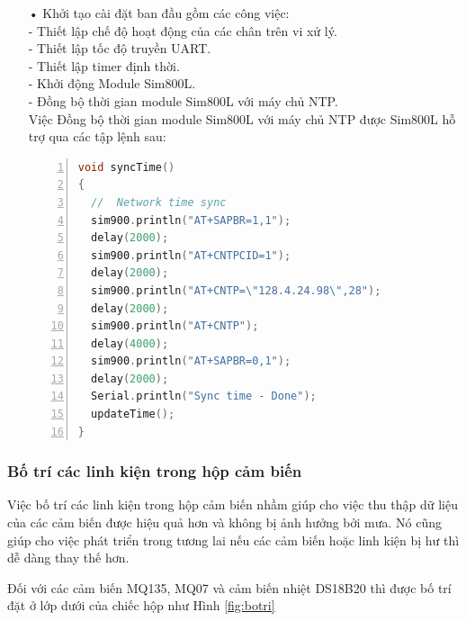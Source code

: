 \begin{itemize}
\item[•]Khởi tạo cài đặt ban đầu gồm các công việc: \\
- Thiết lập chế độ hoạt động của các chân trên vi xử lý.\\
- Thiết lập tốc độ truyền UART.\\
- Thiết lập timer định thời.\\
- Khởi động Module Sim800L.\\
- Đồng bộ thời gian module Sim800L với máy chủ NTP.\\

Việc Đồng bộ thời gian module Sim800L với máy chủ NTP được Sim800L hỗ trợ qua các tập lệnh sau:
\begin{lstlisting}[numbers=left,firstnumber=1,language=C]
void syncTime()
{
  //  Network time sync
  sim900.println("AT+SAPBR=1,1");
  delay(2000);
  sim900.println("AT+CNTPCID=1");
  delay(2000);
  sim900.println("AT+CNTP=\"128.4.24.98\",28");
  delay(2000);
  sim900.println("AT+CNTP");
  delay(4000);  
  sim900.println("AT+SAPBR=0,1");
  delay(2000);
  Serial.println("Sync time - Done");
  updateTime();
}
\end{lstlisting}







\end{itemize}









\subsubsection*{Bố trí các linh kiện trong hộp cảm biến}
Việc bố trí các linh kiện trong hộp cảm biến nhầm giúp cho việc thu thập dữ liệu của các cảm biến được hiệu quả hơn và không bị ảnh hưởng bởi mưa. Nó cũng giúp cho việc phát triển trong tương lai nếu các cảm biến hoặc linh kiện bị hư thì dễ dàng thay thế hơn.

Đối với các cảm biến MQ135, MQ07 và cảm biến nhiệt DS18B20 thì được bố trí đặt ở lớp dưới của chiếc hộp như Hình \ref{fig:botri}

